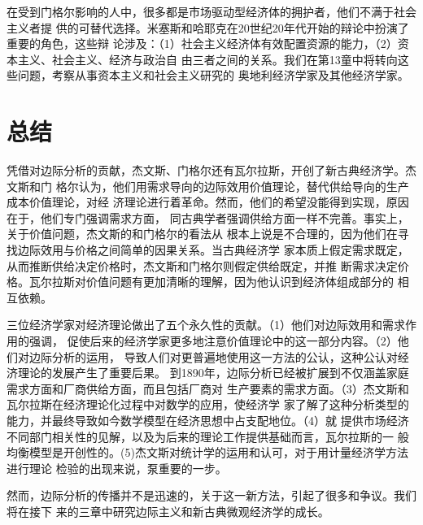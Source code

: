 在受到门格尔影响的人中，很多都是市场驱动型经济体的拥护者，他们不满于社会主义者提
供的可替代选择。米塞斯和哈耶克在20世纪20年代开始的辩论中扮演了重要的角色，这些辩
论涉及：（1）社会主义经济体有效配置资源的能力，（2）资本主义、社会主义、经济与政治自
由三者之间的关系。我们在第13童中将转向这些问题，考察从事资本主义和社会主义研究的
奥地利经济学家及其他经济学家。

\section{总结}

凭借对边际分析的贡献，杰文斯、门格尔还有瓦尔拉斯，开创了新古典经济学。杰文斯和门
格尔认为，他们用需求导向的边际效用价值理论，替代供给导向的生产成本价值理论，对经
济理论进行着革命。然而，他们的希望没能得到实现，原因在于，他们专门强调需求方面，
同古典学者强调供给方面一样不完善。事实上，关于价值问题，杰文斯的和门格尔的看法从
根本上说是不合理的，因为他们在寻找边际效用与价格之间简单的因果关系。当古典经济学
家本质上假定需求既定，从而推断供给决定价格时，杰文斯和门格尔则假定供给既定，并推
断需求决定价格。瓦尔拉斯对价值问题有更加清晰的理解，因为他认识到经济体组成部分的
相互依赖。

三位经济学家对经济理论做出了五个永久性的贡献。（1）他们对边际效用和需求作用的强调，
促使后来的经济学家更多地注意价值理论中的这一部分内容。（2）他们对边际分析的运用，
导致人们对更普遍地使用这一方法的公认，这种公认对经济理论的发展产生了重要后果。
到1890年，边际分析已经被扩展到不仅涵盖家庭需求方面和厂商供给方面，而且包括厂商对
生产要素的需求方面。（3）杰文斯和瓦尔拉斯在经济理论化过程中对数学的应用，使经济学
家了解了这种分析类型的能力，并最终导致如今数学模型在经济思想中占支配地位。（4）就
提供市场经济不同部门相关性的见解，以及为后来的理论工作提供基础而言，瓦尔拉斯的一
般均衡模型是开创性的。(5)杰文斯对统计学的运用和认可，对于用计量经济学方法进行理论
检验的出现来说，泵重要的一步。

然而，边际分析的传播并不是迅速的，关于这一新方法，引起了很多和争议。我们将在接下
来的三章中研究边际主义和新古典微观经济学的成长。


